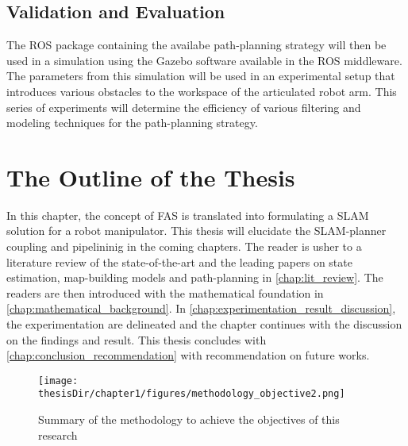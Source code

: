 \subsection{Validation and Evaluation}\label{sec:validation_methodology}
The ROS package containing the availabe path-planning strategy will then be used in a simulation
using the Gazebo software available in the ROS middleware. The parameters from this simulation will be
used in an experimental setup that introduces various obstacles to the workspace of the articulated robot
arm. This series of experiments will determine the efficiency of various filtering and modeling techniques
for the path-planning strategy.

\fi

\section{The Outline of the Thesis}\label{sec:thesis_outline}
In this chapter, the concept of FAS is translated into
formulating a SLAM solution for a robot manipulator. 
This thesis will elucidate  the SLAM-planner 
coupling and pipelininig in the coming chapters.
The reader is usher to a literature review 
of the state-of-the-art and the 
leading papers on state estimation, map-building models and path-planning in \autoref{chap:lit_review}.
The readers are then introduced with 
the mathematical foundation
in \autoref{chap:mathematical_background}.
In \autoref{chap:experimentation_result_discussion}, the experimentation are delineated and the chapter continues with 
the discussion on the findings and result. 
This thesis concludes with 
\autoref{chap:conclusion_recommendation} with recommendation 
on future works. 

\begin{figure}[h]
  \centering
  \texttt{[image: \\thesisDir/chapter1/figures/methodology\_objective2.png]}
  \caption{Summary of the methodology to achieve the objectives of this research}
  \label{fig:methodology_objective}
\end{figure}




